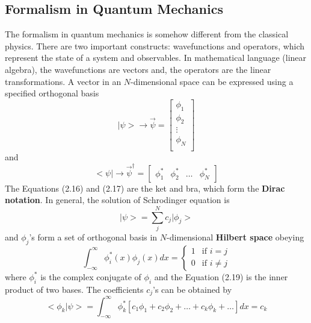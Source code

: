 \subsection{Formalism in Quantum Mechanics}
The formalism in quantum mechanics is somehow different from the classical physics. There are two important constructs: wavefunctions and operators, which represent the state of a system and observables. In mathematical language (linear algebra), the wavefunctions are vectors and, the operators are the linear transformations. A vector in an $N$-dimensional space can be expressed using a specified orthogonal basis \begin{equation}
    \big|\psi\big>\rightarrow\vec{\psi}=
    \left[
    \begin{matrix}
    \phi_{1} \\
    \phi_{2} \\
    \vdots \\
    \phi_{N} \\
    \end{matrix}
    \right]
\end{equation} and \begin{equation}
    \big<\psi\big|\rightarrow\vec{\psi}^{\dagger}=
    \left[
    \begin{matrix}
    \phi_{1}^{*} & \phi_{2}^{*} & \ldots & \phi_{N}^{*}
    \end{matrix}
    \right]
\end{equation} The Equations (2.16) and (2.17) are the ket and bra, which form the {\bf{Dirac notation}}. In general, the solution of Schrodinger equation is \begin{equation}
    \big|\psi\big>=\sum_{j}^{N}{c_{j}\big|\phi_{j}\big>}
\end{equation} and $\phi_{j}$'s form a set of orthogonal basis in $N$-dimensional {\bf Hilbert space} obeying \begin{equation}
    \int_{-\infty}^{\infty}\phi_{i}^{*}\left(x\right)\phi_{j}\left(x\right)dx =
    \begin{cases}
    1 & \text{if }i = j \\
    0 & \text{if }i \neq j
    \end{cases}
\end{equation} where $\phi_{i}^{*}$ is the complex conjugate of $\phi_{i}$ and the Equation (2.19) is the inner product of two bases. The coefficients $c_{j}$'s can be obtained by \begin{equation}
    \boxed{\big<\phi_{k}\big|\psi\big> = \int_{-\infty}^{\infty}\phi_{k}^{*}\left[c_{1}\phi_{1}+c_{2}\phi_{2}+\ldots+c_{k}\phi_{k}+\ldots\right]dx = c_{k}}

\end{equation}
